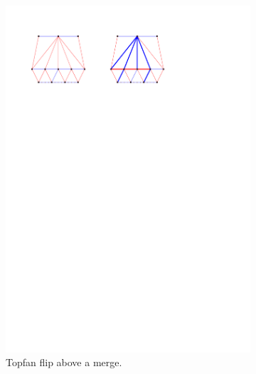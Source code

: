 \begin{figure}[!b]
\begin{subfigure}[t]{0.45 \textwidth}
        \includegraphics[width = \textwidth]{topFanFlips/img/merge}
        \caption{Topfan flip above a merge.}
        \label{fig:fanflip:merge}
    \end{subfigure}
    ~
    \begin{subfigure}[t]{0.45 \textwidth}

\end{subfigure}
\end{figure}
